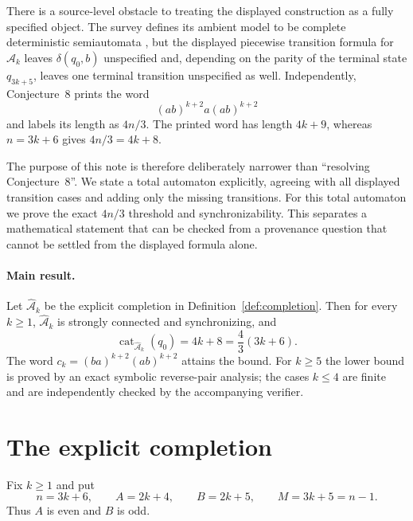 \documentclass[11pt]{article}
\theoremstyle{definition}
\theoremstyle{remark}
\newcommand{\Ahat}{\widehat{\mathcal A}}
\newcommand{\cat}{\operatorname{cat}}
\begin{document}
There is a source-level obstacle to treating the displayed construction as a fully specified object. The survey defines its ambient model to be complete deterministic semiautomata \cite[Sec.~1.1]{Szykula2026}, but the displayed piecewise transition formula for $\mathcal A_k$ leaves $\delta(q_0,b)$ unspecified and, depending on the parity of the terminal state $q_{3k+5}$, leaves one terminal transition unspecified as well. Independently, Conjecture~8 prints the word
\[
 (ab)^{k+2}a(ab)^{k+2}
\]
and labels its length as $4n/3$. The printed word has length $4k+9$, whereas $n=3k+6$ gives $4n/3=4k+8$.

The purpose of this note is therefore deliberately narrower than ``resolving Conjecture~8''. We state a total automaton explicitly, agreeing with all displayed transition cases and adding only the missing transitions. For this total automaton we prove the exact $4n/3$ threshold and synchronizability. This separates a mathematical statement that can be checked from a provenance question that cannot be settled from the displayed formula alone.

\paragraph{Main result.}
Let $\Ahat_k$ be the explicit completion in Definition~\ref{def:completion}. Then for every $k\ge1$, $\Ahat_k$ is strongly connected and synchronizing, and
\[
 \cat_{\Ahat_k}(q_0)=4k+8=\frac{4}{3}(3k+6).
\]
The word $c_k=(ba)^{k+2}(ab)^{k+2}$ attains the bound. For $k\ge5$ the lower bound is proved by an exact symbolic reverse-pair analysis; the cases $k\le4$ are finite and are independently checked by the accompanying verifier.

\section{The explicit completion}
Fix $k\ge1$ and put
\[
 n=3k+6,\qquad A=2k+4,\qquad B=2k+5,\qquad M=3k+5=n-1.
\]
Thus $A$ is even and $B$ is odd.
\end{document}
